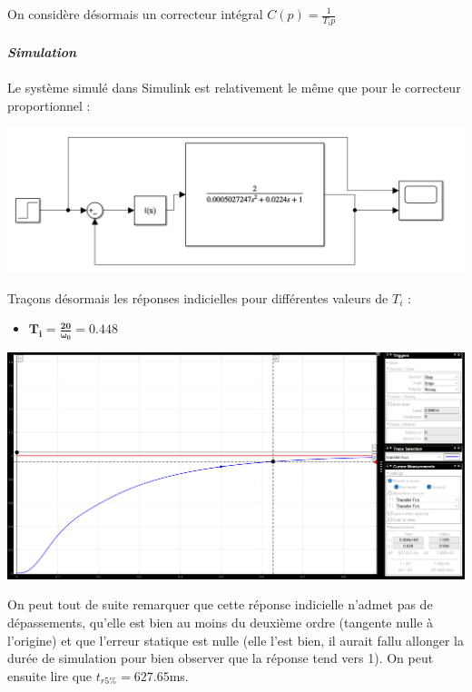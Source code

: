 \documentclass[12pt]{article}
\begin{document}
On considère désormais un correcteur intégral $C(p) = \frac{1}{T_ip}$
\\\\\Large \textit{ \textbf{Simulation}} 
\\\\\normalsize Le système simulé dans Simulink est relativement le même que pour le correcteur proportionnel : 
\begin{center}
    \includegraphics[width = 12 cm]{TP2 Simulink/Syst_2/Syst_2_Simulink_I.png}
\end{center}

Traçons désormais les réponses indicielles pour différentes valeurs de $T_i$ : 
\begin{itemize}
    \item \large $\mathbf{T_i = \frac{20}{\omega_0} = 0.448}$
\end{itemize}

\begin{center}
    \includegraphics[width = 16 cm]{TP2 Simulink/Syst_2/tr5prct_4.2_Ti=20_sur_omega0.png}

\end{center}
On peut tout de suite remarquer que cette réponse indicielle n'admet pas de dépassements, qu'elle est bien au moins du deuxième ordre (tangente nulle à l'origine) et que l'erreur statique est nulle (elle l'est bien, il aurait fallu allonger la durée de simulation pour bien observer que la réponse tend vers 1).
On peut ensuite lire que $t_{r5\%} = 627.65$ms.
\end{document}
